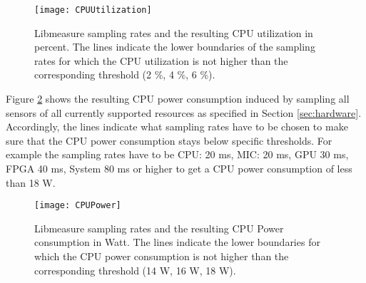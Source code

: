 \begin{figure}[!h]
\begin{center}
\texttt{[image: CPUUtilization]} 
\caption{Libmeasure sampling rates and the resulting CPU utilization in percent. The lines indicate the lower boundaries of the sampling rates for which the CPU utilization is not higher than the corresponding threshold (2 \%, 4 \%, 6 \%).}
\label{fig:CPUUtilization}
\end{center}
\end{figure}

Figure \ref{fig:CPUPower} shows the resulting CPU power consumption induced by sampling all sensors of all currently supported resources as specified in Section \ref{sec:hardware}. Accordingly, the lines indicate what sampling rates have to be chosen to make sure that the CPU power consumption stays below specific thresholds. For example the sampling rates have to be CPU: 20 ms, MIC: 20 ms, GPU 30 ms, FPGA 40 ms, System 80 ms or higher to get a CPU power consumption of less than 18 W.\\

\begin{figure}[!h]
\begin{center}
\texttt{[image: CPUPower]} 
\caption{Libmeasure sampling rates and the resulting CPU Power consumption in Watt. The lines indicate the lower boundaries for which the CPU power consumption is not higher than the corresponding threshold (14 W, 16 W, 18 W).}
\label{fig:CPUPower}
\end{center}
\end{figure}

